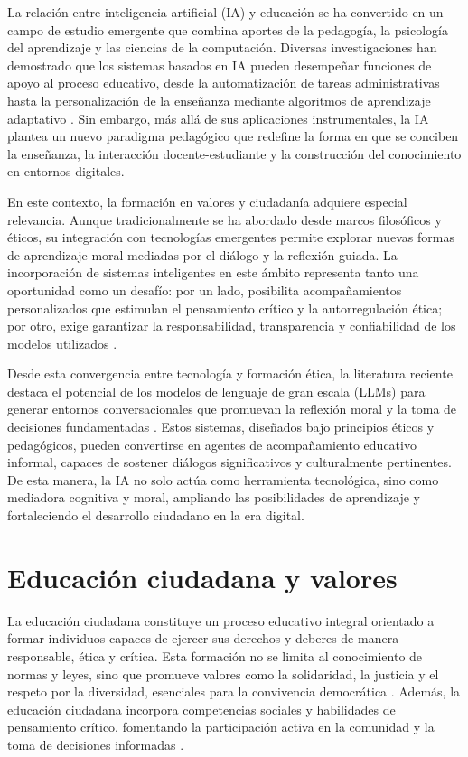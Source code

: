 La relación entre inteligencia artificial (IA) y educación se ha convertido en
un campo de estudio emergente que combina aportes de la pedagogía, la
psicología del aprendizaje y las ciencias de la computación. Diversas
investigaciones han demostrado que los sistemas basados en IA pueden desempeñar
funciones de apoyo al proceso educativo, desde la automatización de tareas
administrativas hasta la personalización de la enseñanza mediante algoritmos de
aprendizaje adaptativo \cite{elstad2024ai,frontiers2025education}. Sin embargo,
más allá de sus aplicaciones instrumentales, la IA plantea un nuevo paradigma
pedagógico que redefine la forma en que se conciben la enseñanza, la
interacción docente-estudiante y la construcción del conocimiento en entornos
digitales.

En este contexto, la formación en valores y ciudadanía adquiere especial
relevancia. Aunque tradicionalmente se ha abordado desde marcos filosóficos y
éticos, su integración con tecnologías emergentes permite explorar nuevas
formas de aprendizaje moral mediadas por el diálogo y la reflexión guiada. La
incorporación de sistemas inteligentes en este ámbito representa tanto una
oportunidad como un desafío: por un lado, posibilita acompañamientos
personalizados que estimulan el pensamiento crítico y la autorregulación ética;
por otro, exige garantizar la responsabilidad, transparencia y confiabilidad de
los modelos utilizados \cite{betterinternet2024,carter2024ethics}.

Desde esta convergencia entre tecnología y formación ética, la literatura
reciente destaca el potencial de los modelos de lenguaje de gran escala (LLMs)
para generar entornos conversacionales que promuevan la reflexión moral y la
toma de decisiones fundamentadas \cite{seibt2024llm,frontiers2025psychology}.
Estos sistemas, diseñados bajo principios éticos y pedagógicos, pueden
convertirse en agentes de acompañamiento educativo informal, capaces de
sostener diálogos significativos y culturalmente pertinentes. De esta manera,
la IA no solo actúa como herramienta tecnológica, sino como mediadora cognitiva
y moral, ampliando las posibilidades de aprendizaje y fortaleciendo el
desarrollo ciudadano en la era digital.

\section{Educación ciudadana y valores}
La educación ciudadana constituye un proceso educativo integral orientado a
formar individuos capaces de ejercer sus derechos y deberes de manera
responsable, ética y crítica. Esta formación no se limita al conocimiento de
normas y leyes, sino que promueve valores como la solidaridad, la justicia y el
respeto por la diversidad, esenciales para la convivencia democrática
\cite{unesco2021global, schulz2010iccs}. Además, la educación ciudadana
incorpora competencias sociales y habilidades de pensamiento crítico,
fomentando la participación activa en la comunidad y la toma de decisiones
informadas \cite{bentley2018education}.

